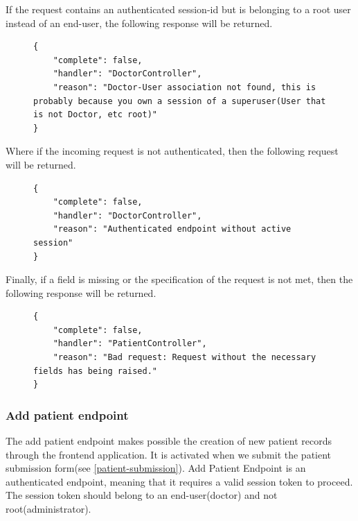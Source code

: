 					If the request contains an authenticated session-id but is belonging to a root user instead of an end-user, 
					the following response will be returned.
					\begin{figure}[H]
						\iftrue
						\begin{lstlisting}[]
{
	"complete": false,
	"handler": "DoctorController",
	"reason": "Doctor-User association not found, this is probably because you own a session of a superuser(User that is not Doctor, etc root)"
}
						\end{lstlisting}
					\end{figure}
					Where if the incoming request is not authenticated, then the following request will be returned.
					\begin{figure}[H]
						\iftrue
						\begin{lstlisting}[]
{
	"complete": false,
	"handler": "DoctorController",
	"reason": "Authenticated endpoint without active session"
}
						\end{lstlisting}
					\end{figure}
					Finally, if a field is missing or the specification of the request is not met, then the following response will be returned.
					\begin{figure}[H]
						\iftrue
						\begin{lstlisting}[]
{
	"complete": false,
	"handler": "PatientController",
	"reason": "Bad request: Request without the necessary fields has being raised."
}					
						\end{lstlisting}
					\end{figure}
				\subsubsection{Add patient endpoint}
				
					The add patient endpoint makes possible the creation of new patient records through the frontend application. 
					It is activated when we submit the patient submission form(see \ref{patient-submission}). Add Patient Endpoint 
					is an authenticated endpoint, meaning that it requires a valid session token to proceed. The session token should 
					belong to an end-user(doctor) and not root(administrator).

